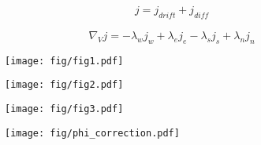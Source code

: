 \documentclass[12pt, a4paper]{article}
\begin{document}
\begin{eqnarray}
    j = j_{drift}+j_{diff}
\end{eqnarray}

\begin{equation}
    \nabla_{V} j = -\lambda_w j_w + \lambda_e j_e - \lambda_s j_s + \lambda_n j_n
\end{equation}


\begin{figure}
    \texttt{[image: fig/fig1.pdf]}
\end{figure}

\begin{figure}
    \texttt{[image: fig/fig2.pdf]}
\end{figure}

\begin{figure}
    \texttt{[image: fig/fig3.pdf]}
\end{figure}

\begin{figure}
    \texttt{[image: fig/phi\_correction.pdf]}
\end{figure}
\end{document}
